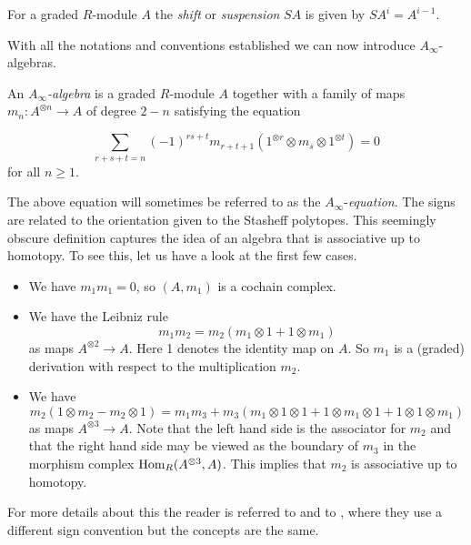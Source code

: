 \documentclass[Thesis.tex]{subfiles}
\begin{document}
\begin{defin}
For a graded $R$-module $A$ the \emph{shift} or \emph{suspension} $SA$ is given by $SA^i=A^{i-1}$. %
\end{defin}

With all the notations and conventions established we can now introduce $A_\infty$-algebras. 

\begin{defin}\label{ainftyalgebra}
An \emph{$A_\infty$-algebra} is a graded $R$-module $A$ together with a family of maps $m_n:A^{\otimes n}\to A$ of degree $2-n$ satisfying the equation

\begin{equation}\label{ainftyequation}
\sum_{r+s+t=n}(-1)^{rs+t}m_{r+t+1}(1^{\otimes r}\otimes m_s\otimes 1^{\otimes t})=0
\end{equation}
for all $n\geq 1$.
\end{defin}
The above equation will sometimes be referred to as the $A_\infty$-\emph{equation}. The signs are related to the orientation given to the Stasheff polytopes. This seemingly obscure definition captures the idea of an algebra that is associative up to homotopy. To see this, let us have a look at the first few cases.

\begin{itemize}
\item We have $m_1m_1=0$, so $(A, m_1)$ is a cochain complex.
\item We have the Leibniz rule
\[
m_1 m_2 = m_2 (m_1 \otimes 1 + 1 \otimes m_1)
\]
as maps $A^{\otimes 2}\to A$. Here 1 denotes the identity map on $A$. So $m_1$ is
a (graded) derivation with respect to the multiplication $m_2$.
\item We have
\[
m_2(1\otimes m_2 − m_2\otimes 1)= m_1m_3 + m_3 (m_1\otimes 1\otimes 1 + 1\otimes m_1\otimes 1 + 1\otimes 1\otimes m_1)
\]
as maps $A^{\otimes 3}\to A$. Note that the left hand side is the associator for $m_2$ and
that the right hand side may be viewed as the boundary of $m_3$ in the morphism
complex $\operatorname{Hom}_R (A^{\otimes 3},A)$. This implies that $m_2$ is associative up to homotopy. 
\end{itemize}


 For more details about this the reader is referred to \cite{keller} and to \cite[\S 9.2]{lodayvallette}, where they use a different sign convention but the concepts are the same.
\end{document}

